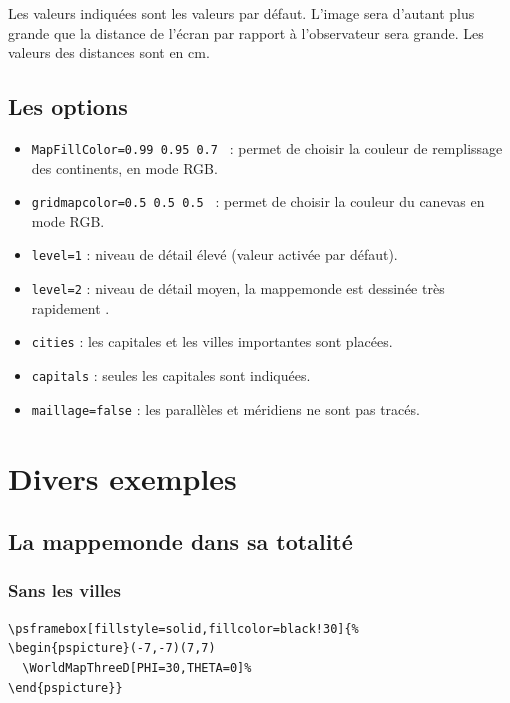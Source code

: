 \documentclass[11pt,french,BCOR10mm,DIV12,bibliography=totoc,parskip=false,
   smallheadings, headexclude,footexclude,oneside]{pst-doc}
\let\Parameter\texttt
\begin{document}
Les valeurs indiquées sont les valeurs par défaut. L'image sera d'autant
plus grande que la distance de l'écran par rapport à l'observateur sera
grande. Les valeurs des distances sont en \textsf{cm}.
\subsection{Les options}
\begin{itemize}
\item  \Parameter{MapFillColor=0.99 0.95 0.7 } : permet de choisir la couleur de remplissage des continents,
 en mode RGB.
\item  \Parameter{gridmapcolor=0.5 0.5 0.5 } : permet de choisir la couleur du canevas en mode RGB.
\item \Parameter{level=1} : niveau de détail élevé (valeur activée par défaut).
\item \Parameter{level=2} : niveau de détail moyen, la mappemonde est dessinée très rapidement .
\item \Parameter{cities} : les capitales et les villes importantes sont placées.
\item \Parameter{capitals} : seules les capitales sont indiquées.
\item \Parameter{maillage=false} : les parallèles et méridiens ne sont pas tracés.
\end{itemize}

\clearpage

\section{Divers exemples}
\subsection{La mappemonde dans sa totalité}
\subsubsection{Sans les villes}
\begin{verbatim}
\psframebox[fillstyle=solid,fillcolor=black!30]{%
\begin{pspicture}(-7,-7)(7,7)
  \WorldMapThreeD[PHI=30,THETA=0]%
\end{pspicture}}
\end{verbatim}
\end{document}
